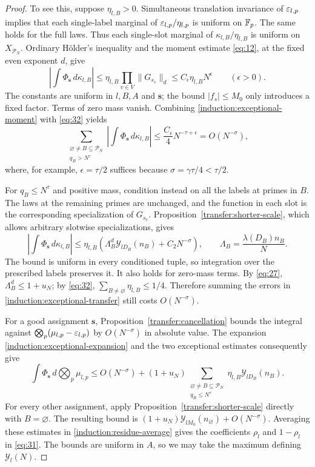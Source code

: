 \begin{proof}
To see this, suppose $\eta_{l,B}>0$.  Simultaneous translation invariance
of $\varepsilon_{l,p}$ implies that each single-label marginal of
$\varepsilon_{l,p}/\eta_{l,p}$ is uniform on $\mathbb F_p$.  The same holds for the full
laws.  Thus each single-slot marginal of $\kappa_{l,B}/\eta_{l,B}$ is
uniform on $X_{\mathcal P_N}$.  Ordinary H\"older's inequality and the
moment estimate \eqref{eq:12}, at the fixed even exponent $d$, give
\begin{equation}
 \left|\int\Phi_{\mathbf s}\,d\kappa_{l,B}\right|
 \le\eta_{l,B}\prod_{v\in V}\|G_{s_v}\|_d
 \le C_\epsilon\eta_{l,B}N^\epsilon
 \qquad(\epsilon>0).
 \label{induction:exceptional-moment}
\end{equation}
The constants are uniform in $l,B,A$ and $\mathbf s$; the bound
$|f_s|\le M_0$ only introduces a fixed factor.  Terms of zero mass vanish.
Combining \eqref{induction:exceptional-moment} with \eqref{eq:32} yields
\[
 \sum_{\substack{\varnothing\ne B\subseteq\mathcal P_N\\q_B>N^\tau}}
   \left|\int\Phi_{\mathbf s}\,d\kappa_{l,B}\right|
 \le \frac{C_\epsilon}{4}N^{-\tau+\epsilon}
 =O(N^{-\sigma}),
\]
where, for example, $\epsilon=\tau/2$ suffices because
$\sigma=\gamma\tau/4<\tau/2$.

For $q_B\le N^\tau$ and positive mass, condition instead on all the
labels at primes in $B$.  The laws at the remaining primes are unchanged,
and the function in each slot is the corresponding specialization of
$G_{s_v}$.  Proposition~\ref{transfer:shorter-scale}, which allows arbitrary
slotwise specializations, gives
\begin{equation}
 \left|\int\Phi_{\mathbf s}\,d\kappa_{l,B}\right|
 \le\eta_{l,B}\left(
      \Lambda_B^d\mathcal Y_{lD_B}(n_B)+C_2N^{-\sigma}\right),
 \qquad
 \Lambda_B=\frac{\lambda(D_B)n_B}{N}.
 \label{induction:exceptional-transfer}
\end{equation}
The bound is uniform in every conditioned tuple, so integration over
the prescribed labels preserves it.  It also holds for zero-mass terms.
By \eqref{eq:27}, $\Lambda_B^d\le1+u_N$; by \eqref{eq:32},
$\sum_{B\ne\varnothing}\eta_{l,B}\le1/4$.  Therefore summing the errors
in \eqref{induction:exceptional-transfer} still costs $O(N^{-\sigma})$.

For a good assignment $\mathbf s$, Proposition~\ref{transfer:cancellation}
bounds the integral against
$\bigotimes_p(\mu_{l,p}-\varepsilon_{l,p})$ by $O(N^{-\sigma})$ in absolute
value.  The expansion \eqref{induction:exceptional-expansion} and the
two exceptional estimates consequently give
\[
 \int\Phi_{\mathbf s}\,d\bigotimes_p\mu_{l,p}
 \le O(N^{-\sigma})+(1+u_N)
   \sum_{\substack{\varnothing\ne B\subseteq\mathcal P_N\\q_B\le N^\tau}}
     \eta_{l,B}\mathcal Y_{lD_B}(n_B).
\]
For every other assignment, apply
Proposition~\ref{transfer:shorter-scale} directly with $B=\varnothing$.
The resulting bound is
$(1+u_N)\mathcal Y_{lM_0}(n_\varnothing)+O(N^{-\sigma})$.
Averaging these estimates in \eqref{induction:residue-average} gives
the coefficients $\rho_l$ and $1-\rho_l$ in \eqref{eq:31}.
The bounds are uniform in $A$, so we may take the maximum defining
$\mathcal Y_l(N)$.


\end{proof}
